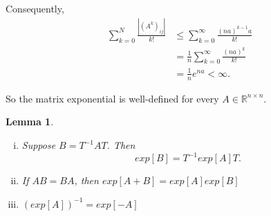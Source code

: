 \documentclass{tufte-handout}
\newcommand*\R{\mathbb{R}}
\newtheorem{lemma}[thm]{Lemma}
\theoremstyle{definition}
\begin{document}
Consequently,
\begin{align*}
	\sum\limits_{k=0}^{N} \frac{\left| (A^k)_{ij} \right|}{k!} &\le \sum\limits_{k=0}^{\infty} \frac{\left( na \right)^{k-1}a}{k!} \\
															   &= \frac{1}{n} \sum\limits_{k=0}^{\infty} \frac{\left( na \right)^{k}}{k!} \\
															   &= \frac{1}{n} e^{na} < \infty
.\end{align*}

So the matrix exponential is well-defined for every $A \in \R^{n \times n}$. 

\begin{lemma} \label{lem:10-21-1}
	\begin{enumerate}[(i)]
		\item Suppose $B = T^{-1}AT$. Then \[
			exp[B] = T^{-1} exp[A] T
			.\] 
			\item If $AB = BA$, then $exp[A+B] = exp[A] exp[B]$
			\item $\left( exp[A] \right)^{-1} = exp[-A]$
	\end{enumerate}
\end{lemma}
\end{document}
